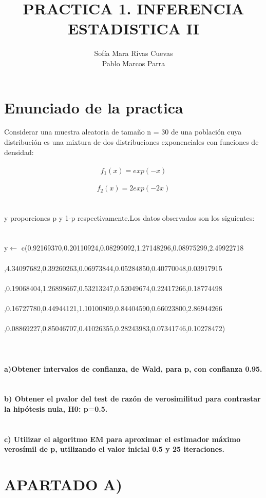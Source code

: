 \documentclass[10pt,a4paper]{article}
\author{Sofía Mara Rivas Cuevas\\ Pablo Marcos Parra}
\title{PRACTICA 1. INFERENCIA ESTADISTICA II}
\begin{document}
\maketitle{}
\section{Enunciado de la practica}
Considerar una muestra aleatoria de tamaño n = 30 de una población cuya distribución es una mixtura de dos distribuciones exponenciales con funciones de densidad:\\
\\
\[f_{1}(x) = exp(-x)\]
\\
\[f_{2}(x) = 2exp(-2x)\]\\
\\
y proporciones p y 1-p respectivamente.Los datos observados son los siguientes:\\
\\
\\
y$\leftarrow$ c(0.92169370,0.20110924,0.08299092,1.27148296,0.08975299,2.49922718\\
\\
,4.34097682,0.39260263,0.06973844,0.05284850,0.40770048,0.03917915\\
\\
,0.19068404,1.26898667,0.53213247,0.52049674,0.22417266,0.18774498\\
\\
,0.16727780,0.44944121,1.10100809,0.84404590,0.66023800,2.86944266\\
\\
,0.08869227,0.85046707,0.41026355,0.28243983,0.07341746,0.10278472)\\
\\
\\
\\
\textbf{a)Obtener intervalos de confianza, de Wald, para p, con confianza 0.95.}\\
\\
\\
\textbf{b) Obtener el pvalor del test de razón de verosimilitud para contrastar la hipótesis nula, H0: p=0.5.}
\\
\\
\\
\textbf{c) Utilizar el algoritmo EM para aproximar el estimador máximo verosímil de p, utilizando el valor inicial 0.5 y 25 iteraciones.} 

\newpage
\section{APARTADO A)}
\end{document}
